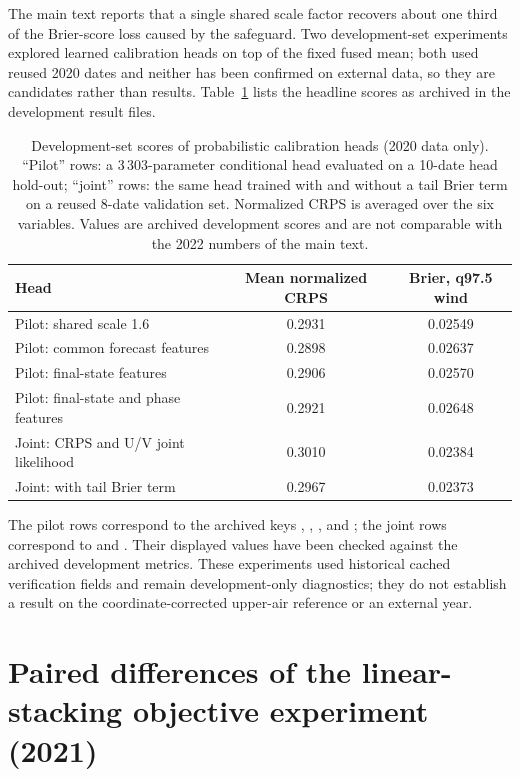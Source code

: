 \documentclass[12pt]{article}
\begin{document}
The main text reports that a single shared scale factor recovers about one third of the Brier-score loss caused by the safeguard. Two development-set experiments explored learned calibration heads on top of the fixed fused mean; both used reused 2020 dates and neither has been confirmed on external data, so they are candidates rather than results. Table~\ref{tab:heads} lists the headline scores as archived in the development result files.

\begin{table}[h!]
\linespread{1}\selectfont
\caption{Development-set scores of probabilistic calibration heads (2020 data only). ``Pilot'' rows: a 3\,303-parameter conditional head evaluated on a 10-date head hold-out; ``joint'' rows: the same head trained with and without a tail Brier term on a reused 8-date validation set. Normalized CRPS is averaged over the six variables. Values are archived development scores and are not comparable with the 2022 numbers of the main text.}
\label{tab:heads}
\vspace*{2mm}
\centering
{\linespread{1.0}\selectfont\small
\begin{tabular}{lcc}
\hline
Head & Mean normalized CRPS & Brier, q97.5 wind \\
\hline
Pilot: shared scale 1.6 & 0.2931 & 0.02549 \\
Pilot: common forecast features & 0.2898 & 0.02637 \\
Pilot: final-state features & 0.2906 & 0.02570 \\
Pilot: final-state and phase features & 0.2921 & 0.02648 \\
Joint: CRPS and U/V joint likelihood & 0.3010 & 0.02384 \\
Joint: with tail Brier term & 0.2967 & 0.02373 \\
\hline
\end{tabular}}
\end{table}
\noindent The pilot rows correspond to the archived keys , , , and ; the joint rows correspond to  and . Their displayed values have been checked against the archived development metrics. These experiments used historical cached verification fields and remain development-only diagnostics; they do not establish a result on the coordinate-corrected upper-air reference or an external year.

\clearpage
\section{Paired differences of the linear-stacking objective experiment (2021)}
\end{document}
